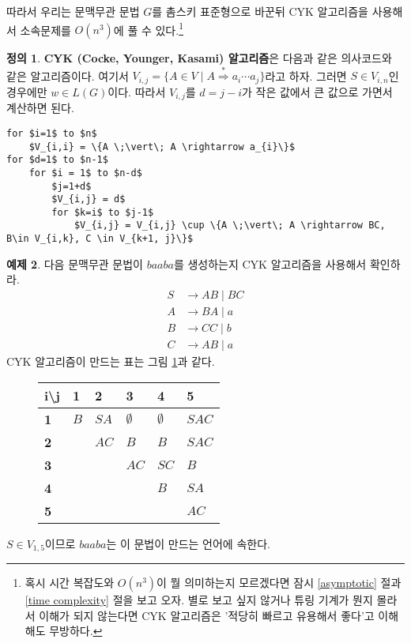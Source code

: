 \documentclass[b5paper, 11pt]{book}
\theoremstyle{definition}
\newtheorem{defn}{정의}[chapter]
\newtheorem{ex}[defn]{예제}
\begin{document}
따라서 우리는 문맥무관 문법 $G$를 촘스키 표준형으로 바꾼뒤 CYK 알고리즘을 사용해서 소속문제를 $O(n^3)$에 풀 수 있다.\footnote{혹시 시간 복잡도와 $O(n^3)$이 뭘 의미하는지 모르겠다면 잠시 \ref{asymptotic} 절과 \ref{time complexity} 절을 보고 오자. 별로 보고 싶지 않거나 튜링 기계가 뭔지 몰라서 이해가 되지 않는다면 CYK 알고리즘은 '적당히 빠르고 유용해서 좋다'고 이해해도 무방하다.} 
\begin{defn}\label{CYK}
    \textbf{CYK (Cocke, Younger, Kasami) 알고리즘}은 다음과 같은 의사코드와 같은 알고리즘이다. 여기서 $V_{i,j} = \{A \in V \;\vert\; A \overset{*}{\Rightarrow} a_i \cdots a_j\}$라고 하자. 그러면 $S \in V_{i,n}$인 경우에만 $w\in L(G)$이다. 따라서 $V_{i,j}$를 $d=j-i$가 작은 값에서 큰 값으로 가면서 계산하면 된다. 
    \begin{lstlisting}
for $i=1$ to $n$
    $V_{i,i} = \{A \;\vert\; A \rightarrow a_{i}\}$
for $d=1$ to $n-1$
    for $i = 1$ to $n-d$
        $j=1+d$
        $V_{i,j} = d$
        for $k=i$ to $j-1$
            $V_{i,j} = V_{i,j} \cup \{A \;\vert\; A \rightarrow BC, B\in V_{i,k}, C \in V_{k+1, j}\}$
    \end{lstlisting}
\end{defn}
\begin{ex}
    다음 문맥무관 문법이 $baaba$를 생성하는지 CYK 알고리즘을 사용해서 확인하라.
    \begin{align*}
        S &\rightarrow AB \;\vert\; BC \\ 
        A &\rightarrow BA \;\vert\; a \\ 
        B &\rightarrow CC \;\vert\; b \\ 
        C &\rightarrow AB \;\vert\; a
    \end{align*}
    CYK 알고리즘이 만드는 표는 그림 \ref{CYK example}과 같다.
    \begin{figure}[!ht]
        \centering
        \begin{tabular}{l|lllll}
        \textbf{i\textbackslash j} & \textbf{1} & \textbf{2} & \textbf{3} & \textbf{4} & \textbf{5} \\ \hline
        \textbf{1} & $B$ & $SA$ & $\emptyset$ & $\emptyset$ & $SAC$ \\
        \textbf{2} &  & $AC$ & $B $&$ B$ & $SAC$ \\
        \textbf{3} &  &  & $AC$ & $SC$ & $B$ \\
        \textbf{4} &  &  &  & $B$ & $SA$ \\
        \textbf{5} &  &  &  &  & $AC$
        \end{tabular}
        \caption{}
        \label{CYK example}
    \end{figure}

    $S \in V_{1,5}$이므로 $baaba$는 이 문법이 만드는 언어에 속한다.
\end{ex}
\end{document}
